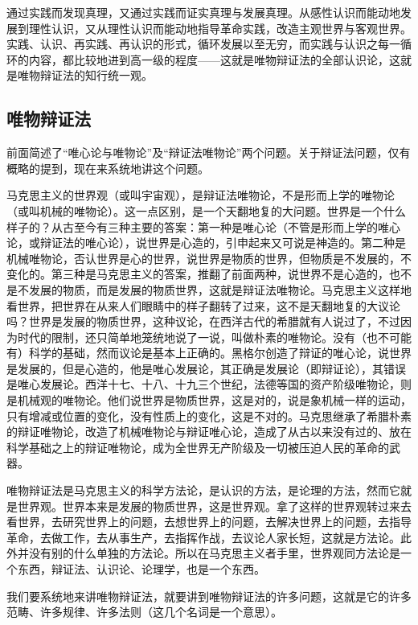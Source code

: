 \documentclass[UTF8, 12pt, a4paper]{ctexrep}
\begin{document}
通过实践而发现真理，又通过实践而证实真理与发展真理。从感性认识而能动地发展到理性认识，又从理性认识而能动地指导革命实践，改造主观世界与客观世界。实践、认识、再实践、再认识的形式，循环发展以至无穷，而实践与认识之每一循环的内容，都比较地进到高一级的程度——这就是唯物辩证法的全部认识论，这就是唯物辩证法的知行统一观。

\subsection{唯物辩证法}

前面简述了“唯心论与唯物论”及“辩证法唯物论”两个问题。关于辩证法问题，仅有概略的提到，现在来系统地讲这个问题。

马克思主义的世界观（或叫宇宙观），是辩证法唯物论，不是形而上学的唯物论（或叫机械的唯物论）。这一点区别，是一个天翻地复的大问题。世界是一个什么样子的？从古至今有三种主要的答案：第一种是唯心论（不管是形而上学的唯心论，或辩证法的唯心论），说世界是心造的，引申起来又可说是神造的。第二种是机械唯物论，否认世界是心的世界，说世界是物质的世界，但物质是不发展的，不变化的。第三种是马克思主义的答案，推翻了前面两种，说世界不是心造的，也不是不发展的物质，而是发展的物质世界，这就是辩证法唯物论。马克思主义这样地看世界，把世界在从来人们眼睛中的样子翻转了过来，这不是天翻地复的大议论吗？世界是发展的物质世界，这种议论，在西洋古代的希腊就有人说过了，不过因为时代的限制，还只简单地笼统地说了一说，叫做朴素的唯物论。没有（也不可能有）科学的基础，然而议论是基本上正确的。黑格尔创造了辩证的唯心论，说世界是发展的，但是心造的，他是唯心发展论，其正确是发展论（即辩证论），其错误是唯心发展论。西洋十七、十八、十九三个世纪，法德等国的资产阶级唯物论，则是机械观的唯物论。他们说世界是物质世界，这是对的，说是象机械一样的运动，只有增减或位置的变化，没有性质上的变化，这是不对的。马克思继承了希腊朴素的辩证唯物论，改造了机械唯物论与辩证唯心论，造成了从古以来没有过的、放在科学基础之上的辩证唯物论，成为全世界无产阶级及一切被压迫人民的革命的武器。

唯物辩证法是马克思主义的科学方法论，是认识的方法，是论理的方法，然而它就是世界观。世界本来是发展的物质世界，这是世界观。拿了这样的世界观转过来去看世界，去研究世界上的问题，去想世界上的问题，去解决世界上的问题，去指导革命，去做工作，去从事生产，去指挥作战，去议论人家长短，这就是方法论。此外并没有别的什么单独的方法论。所以在马克思主义者手里，世界观同方法论是一个东西，辩证法、认识论、论理学，也是一个东西。

我们要系统地来讲唯物辩证法，就要讲到唯物辩证法的许多问题，这就是它的许多范畴、许多规律、许多法则（这几个名词是一个意思）。
\end{document}
